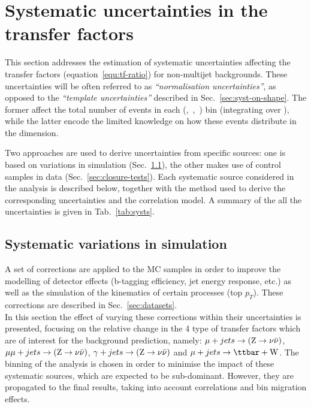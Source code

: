 \section{Systematic uncertainties in the transfer factors}
\label{sec:systematics}

This section addresses the estimation of systematic uncertainties
affecting the transfer factors (equation~\ref{equ:tf-ratio})
for non-multijet backgrounds. 
These uncertainties will be often referred to as \textit{``normalisation uncertainties''}, 
as opposed to the \textit{``template uncertainties''} described in Sec.~\ref{sec:syst-on-shape}. 
The former affect the total number of events in each (\njet,~\nb,~\scalht) bin (integrating over \mht), 
while the latter encode the limited knowledge on how these events distribute in the \mht dimension.

Two approaches are used to derive uncertainties from specific sources:
one is based on variations in simulation (Sec.~\ref{sec:mc-variations}), the other makes use of control samples in data (Sec.~\ref{sec:closure-tests}).
Each systematic source considered in the analysis is described below, 
together with the method used to derive the corresponding uncertainties and the correlation model. 
A summary of the all the uncertainties is given in Tab.~\ref{tab:systs}.



\subsection{Systematic variations in simulation}
\label{sec:mc-variations}
A set of corrections are applied to the MC samples in order to improve the modelling 
of detector effects (b-tagging efficiency, jet energy response, etc.) 
as well as the simulation of the kinematics of certain processes (top $p_{T}$). 
These corrections are described in Sec.~\ref{sec:datasets}. \\
In this section the effect of varying these corrections within their uncertainties is 
presented, focusing on the relative change in the 4 type of transfer factors which are of interest 
for the background prediction, namely: $\mu + jets \rightarrow ({\text Z} \rightarrow \nu\bar{\nu})$,
$\mu\mu + jets \rightarrow ({\text Z} \rightarrow \nu\bar{\nu})$, $\gamma + jets \rightarrow ({\text Z} \rightarrow \nu\bar{\nu})$ and $\mj
\rightarrow \mathrm{\ttbar+W}$. 
The binning of the analysis is chosen in order to minimise the impact of 
these systematic sources, which are expected to be sub-dominant. 
However, they are propagated to the final results, taking into account correlations and bin migration effects.


